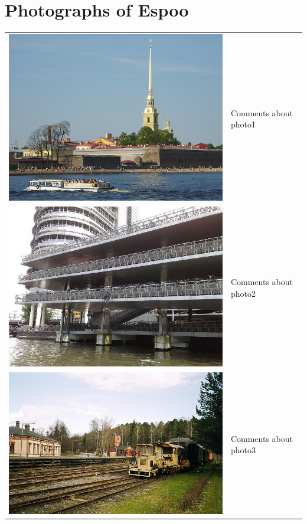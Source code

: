 \documentclass[a4paper]{article}
\newcommand{\mycity}{Espoo\xspace}
\begin{document}
\section{Photographs of \mycity}
\begin{tabular}{lp{}}
\includegraphics[keepaspectratio,width=.5\textwidth]{photo1} & Comments about photo1\\[.2cm]
\includegraphics[keepaspectratio,width=.5\textwidth]{photo2} & Comments about photo2\\[.2cm]
\includegraphics[keepaspectratio,width=.5\textwidth]{photo3} & Comments about photo3\\
\end{tabular}
\end{document}
